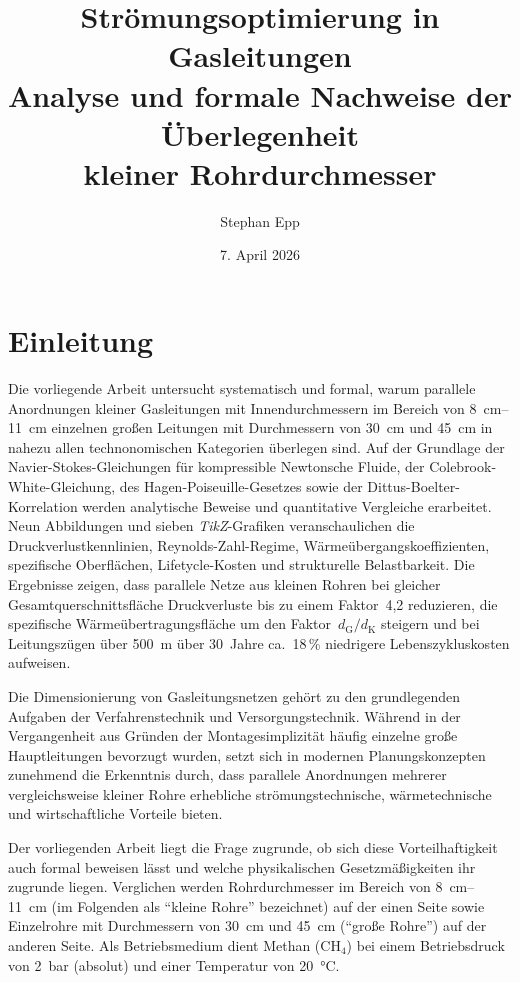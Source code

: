 ﻿\documentclass[12pt,a4paper,twoside]{article}
\title{{\bfseries Strömungsoptimierung in Gasleitungen}\\[-0.1em]
  \Large Analyse und formale Nachweise der Überlegenheit\\
  kleiner Rohrdurchmesser}
\author{Stephan Epp}
\date{7. April 2026}
\theoremstyle{plain}
\theoremstyle{definition}
\theoremstyle{remark}
\begin{document}

\maketitle
\tableofcontents
\newpage

\section{Einleitung}
\label{sec:einleitung}
Die vorliegende Arbeit untersucht systematisch und formal, warum parallele
Anordnungen kleiner Gasleitungen mit Innendurchmessern im Bereich von
\SIrange{8}{11}{\centi\metre} einzelnen großen Leitungen mit Durchmessern von
\SI{30}{\centi\metre} und \SI{45}{\centi\metre} in nahezu allen techno\-nomi\-schen
Kategorien überlegen sind.
Auf der Grundlage der Navier-Stokes-Gleichungen für kompressible Newtonsche Fluide,
der Colebrook-White-Gleichung, des Hagen-Poiseuille-Gesetzes sowie der
Dittus-Boelter-Korrelation werden analytische Beweise und quantitative Vergleiche
erarbeitet.
Neun Abbildungen und sieben \textit{Ti\-kZ}-Grafiken veranschaulichen die
Druckverlustkennlinien, Reynolds-Zahl-Regime, Wärmeübergangskoeffizienten,
spezifische Oberflächen, Lifetycle-Kosten und strukturelle Belastbarkeit.
Die Ergebnisse zeigen, dass parallele Netze aus kleinen Rohren bei gleicher
Gesamtquerschnittsfläche Druck\-ver\-lus\-te bis zu einem Faktor~4{,}2 reduzieren,
die spezifische Wärmeübertragungsfläche um den Faktor~$d_{\mathrm{G}}/d_{\mathrm{K}}$
steigern und bei Leitungszügen über \SI{500}{\metre} über 30~Jahre ca.\ 18\,\%
niedrigere Lebenszykluskosten aufweisen.

Die Dimensionierung von Gasleitungsnetzen gehört zu den grundlegenden
Aufgaben der Verfahrenstechnik und Versorgungstechnik.
Während in der Vergangenheit aus Gründen der Montagesimplizität häufig
einzelne große Hauptleitungen bevorzugt wurden, setzt sich in modernen
Planungskonzepten zunehmend die Erkenntnis durch, dass parallele
Anordnungen mehrerer vergleichsweise kleiner Rohre erhebliche
strömungstechnische, wärme\-technische und wirtschaftliche Vorteile bieten.

Der vorliegenden Arbeit liegt die Frage zugrunde, ob sich diese
Vorteilhaftigkeit auch formal beweisen lässt und welche physikalischen
Gesetzmäßigkeiten ihr zugrunde liegen.
Verglichen werden Rohrdurchmesser im Bereich von \SIrange{8}{11}{\centi\metre}
(im Folgenden als ``kleine Rohre'' bezeichnet) auf der einen Seite sowie
Einzelrohre mit Durchmessern von \SI{30}{\centi\metre} und \SI{45}{\centi\metre}
(``große Rohre'') auf der anderen Seite.
Als Betriebsmedium dient Methan ($\mathrm{CH_4}$) bei einem Betriebsdruck von
\SI{2}{\bar} (absolut) und einer Temperatur von \SI{20}{\celsius}.
\end{document}
